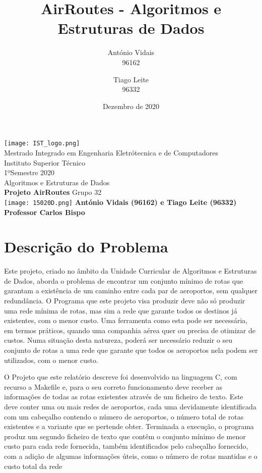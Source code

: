 \documentclass[14pt]{article}
\title{AirRoutes - Algoritmos e Estruturas de Dados}
\date{Dezembro de 2020}
\author{António Vidais \\96162 \and Tiago Leite \\96332}
\begin{document}
    \begin{titlepage}
        \begin{center}

            \texttt{[image: IST\_logo.png]}\\
            \vspace{0.5cm}
            Mestrado Integrado em Engenharia Eletrótecnica e de Computadores\\
            Instituto Superior Técnico\\
            1ºSemestre 2020\\
            Algoritmos e Estruturas de Dados\\
            \vspace*{1.5cm}
            \Huge
            \textbf{Projeto AirRoutes}
            \vspace{0.5cm}
            Grupo 32\\

                \vfill
                \texttt{[image: 15020D.png]}
                \vfill
            \Large
            \textbf{António Vidais (96162) e Tiago Leite (96332)}\\
            \textbf{Professor Carlos Bispo}
        \end{center}
    \end{titlepage}

    \tableofcontents
    \newpage

    \section{Descrição do Problema} \label{sec:d.problema} 
    Este projeto, criado no âmbito da Unidade Curricular de Algoritmos e Estruturas de Dados, aborda o problema de
    encontrar um conjunto mínimo de rotas que garantam a existência de um caminho entre cada par de aeroportos,
    sem qualquer redundância.
    O Programa que este projeto visa produzir deve não só produzir uma rede mínima de rotas, mas sim a rede que garante
    todos os destinos já existentes, com o menor custo.
    Uma ferramenta como esta pode ser necessária, em termos práticos, quando uma companhia aérea quer ou precisa de otimizar de custos.
    Numa situação desta natureza, poderá ser necessário reduzir o seu conjunto de rotas a uma rede que
    garante que todos os aeroportos nela podem ser utilizados, com o menor custo.

    O Projeto que este relatório descreve foi desenvolvido na linguagem C, com recurso a Makefile e, para o seu correto funcionamento deve
    receber as informações de todas as rotas existentes através de um ficheiro de texto.
    Este deve conter uma ou mais redes de aeroportos, cada uma devidamente identificada com um cabeçalho contendo o
    número de aeroportos, o número total de rotas existentes e a variante que se pertende obter.
    Terminada a execução, o programa produz um segundo ficheiro de texto que contêm o conjunto mínimo de menor custo
    para cada rede fornecida, também identificados pelo cabeçalho fornecido, com a adição de algumas informações úteis,
    como o número de rotas mantidas e o custo total da rede
\end{document}
